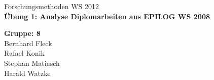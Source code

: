 
\begin{titlepage}
\sffamily

{ \Large Forschungsmethoden WS 2012} \\[2cm]
    
{ \Huge \centering \bfseries Übung 1: Analyse Diplomarbeiten aus EPILOG WS 2008 \\[1.5cm] }

\vfill

{ \large
   { \bfseries Gruppe: 8 \\ }
   Bernhard Fleck \\
   Rafael Konik \\
   Stephan Matiasch \\
   Harald Watzke \\
}
\end{titlepage}
